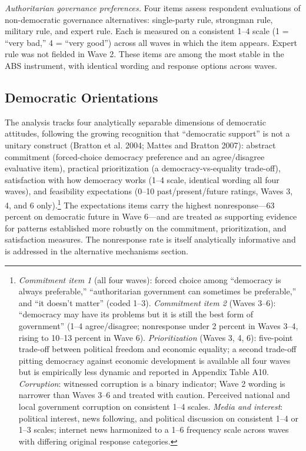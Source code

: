 \documentclass[Review,times,sageh,doublespace]{sagej}
\begin{document}
\emph{Authoritarian governance preferences.} Four items assess
respondent evaluations of non-democratic governance alternatives:
single-party rule, strongman rule, military rule, and expert rule. Each
is measured on a consistent 1--4 scale (1 = ``very bad,'' 4 = ``very
good'') across all waves in which the item appears. Expert rule was not
fielded in Wave 2. These items are among the most stable in the ABS
instrument, with identical wording and response options across waves.

\subsection{Democratic Orientations}\label{democratic-orientations}

The analysis tracks four analytically separable dimensions of democratic
attitudes, following the growing recognition that ``democratic support''
is not a unitary construct (Bratton et al. 2004; Mattes and Bratton
2007): abstract commitment (forced-choice democracy preference and an
agree/disagree evaluative item), practical prioritization (a
democracy-vs-equality trade-off), satisfaction with how democracy works
(1--4 scale, identical wording all four waves), and feasibility
expectations (0--10 past/present/future ratings, Waves 3, 4, and 6
only).\footnote{\emph{Commitment item 1} (all four waves): forced choice
  among ``democracy is always preferable,'' ``authoritarian government
  can sometimes be preferable,'' and ``it doesn't matter'' (coded 1--3).
  \emph{Commitment item 2} (Waves 3--6): ``democracy may have its
  problems but it is still the best form of government'' (1--4
  agree/disagree; nonresponse under 2 percent in Waves 3--4, rising to
  10--13 percent in Wave 6). \emph{Prioritization} (Waves 3, 4, 6):
  five-point trade-off between political freedom and economic equality;
  a second trade-off pitting democracy against economic development is
  available all four waves but is empirically less dynamic and reported
  in Appendix Table A10. \emph{Corruption}: witnessed corruption is a
  binary indicator; Wave 2 wording is narrower than Waves 3--6 and
  treated with caution. Perceived national and local government
  corruption on consistent 1--4 scales. \emph{Media and interest}:
  political interest, news following, and political discussion on
  consistent 1--4 or 1--3 scales; internet news harmonized to a 1--6
  frequency scale across waves with differing original response
  categories.} The expectations items carry the highest nonresponse---63
percent on democratic future in Wave 6---and are treated as supporting
evidence for patterns established more robustly on the commitment,
prioritization, and satisfaction measures. The nonresponse rate is
itself analytically informative and is addressed in the alternative
mechanisms section.
\end{document}
